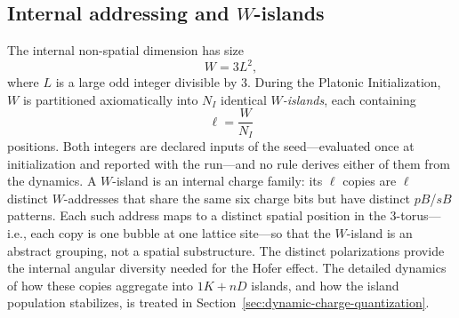 \documentclass{ijuc}
\begin{document}
\subsection{Internal addressing and $W$-islands}\label{subsec:w-islands}
The internal non-spatial dimension has size
\begin{equation}
W=3L^{2},
\end{equation}
where $L$ is a large odd integer divisible by $3$.
During the Platonic Initialization, $W$ is partitioned axiomatically into $N_{I}$ identical \emph{$W$-islands}, each containing
\begin{equation}
\ell=\frac{W}{N_{I}}
\end{equation}
positions.  Both integers are declared inputs of the seed---evaluated once at initialization and reported with the run---and no rule derives either of them from the dynamics.
A $W$-island is an internal charge family: its $\ell$ copies are $\ell$ distinct $W$-addresses that share the same six charge bits but have distinct $pB$/$sB$ patterns.  Each such address maps to a distinct spatial position in the 3-torus---i.e., each copy is one bubble at one lattice site---so that the $W$-island is an abstract grouping, not a spatial substructure.
The distinct polarizations provide the internal angular diversity needed for the Hofer effect.
The detailed dynamics of how these copies aggregate into $1K+nD$ islands, and how the island population stabilizes, is treated in Section~\ref{sec:dynamic-charge-quantization}.
\end{document}
